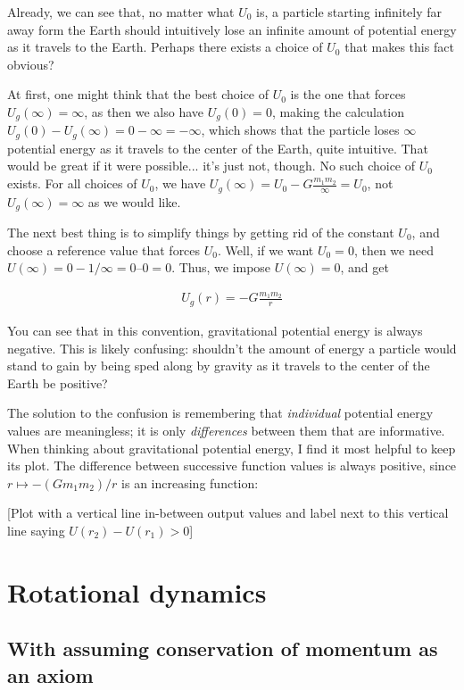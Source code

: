 \documentclass{article}
\begin{document}
Already, we can see that, no matter what $U_0$ is, a particle starting infinitely far away form the Earth should intuitively lose an infinite amount of potential energy as it travels to the Earth. Perhaps there exists a choice of $U_0$ that makes this fact obvious?

At first, one might think that the best choice of $U_0$ is the one that forces $U_g(\infty) = \infty$, as then we also have $U_g(0) = 0$, making the calculation $U_g(0) - U_g(\infty) = 0 - \infty = -\infty$, which shows that the particle loses $\infty$ potential energy as it travels to the center of the Earth, quite intuitive. That would be great if it were possible... it's just not, though. No such choice of $U_0$ exists. For all choices of $U_0$, we have $U_g(\infty) = U_0 - G \frac{m_1 m_2}{\infty} = U_0$, not $U_g(\infty) = \infty$ as we would like.

The next best thing is to simplify things by getting rid of the constant $U_0$, and choose a reference value that forces $U_0$. Well, if we want $U_0 = 0$, then we need $U(\infty) = 0 - 1/\infty = 0 – 0 = 0$. Thus, we impose $U(\infty) = 0$, and get

\begin{align*}
	U_g(r) = -G \frac{m_1 m_2}{r}
\end{align*}

You can see that in this convention, gravitational potential energy is always negative. This is likely confusing: shouldn't the amount of energy a particle would stand to gain by being sped along by gravity as it travels to the center of the Earth be positive?

The solution to the confusion is remembering that \textit{individual} potential energy values are meaningless; it is only \textit{differences} between them that are informative. When thinking about gravitational potential energy, I find it most helpful to keep its plot. The difference between successive function values is always positive, since $r \mapsto -(G m_1 m_2)/r$ is an increasing function:

[Plot with a vertical line in-between output values and label next to this vertical line saying $U(r_2) - U(r_1) > 0$]

\newpage

\section*{Rotational dynamics}

\subsection*{With assuming conservation of momentum as an axiom}
\end{document}
